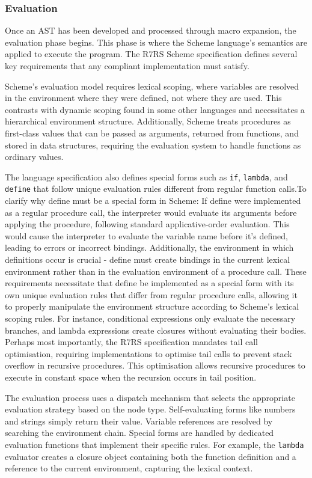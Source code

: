 \documentclass[final]{cmpreport_02}
\begin{document}
\subsubsection{Evaluation}
Once an AST has been developed and processed through macro expansion, the evaluation phase begins. This phase is where the Scheme language's semantics are applied to execute the program. The R7RS Scheme specification defines several key requirements that any compliant implementation must satisfy.

Scheme's evaluation model requires lexical scoping, where variables are resolved in the environment where they were defined, not where they are used. This contrasts with dynamic scoping found in some other languages and necessitates a hierarchical environment structure. Additionally, Scheme treats procedures as first-class values that can be passed as arguments, returned from functions, and stored in data structures, requiring the evaluation system to handle functions as ordinary values.

The language specification also defines special forms such as \texttt{if}, \texttt{lambda}, and \texttt{define} that follow unique evaluation rules different from regular function calls.To clarify why define must be a special form in Scheme: If define were implemented as a regular procedure call, the interpreter would evaluate its arguments before applying the procedure, following standard applicative-order evaluation. This would cause the interpreter to evaluate the variable name before it's defined, leading to errors or incorrect bindings. Additionally, the environment in which definitions occur is crucial - define must create bindings in the current lexical environment rather than in the evaluation environment of a procedure call. These requirements necessitate that define be implemented as a special form with its own unique evaluation rules that differ from regular procedure calls, allowing it to properly manipulate the environment structure according to Scheme's lexical scoping rules. For instance, conditional expressions only evaluate the necessary branches, and lambda expressions create closures without evaluating their bodies. Perhaps most importantly, the R7RS specification mandates tail call optimisation, requiring implementations to optimise tail calls to prevent stack overflow in recursive procedures. This optimisation allows recursive procedures to execute in constant space when the recursion occurs in tail position.

The evaluation process uses a dispatch mechanism that selects the appropriate evaluation strategy based on the node type. Self-evaluating forms like numbers and strings simply return their value. Variable references are resolved by searching the environment chain. Special forms are handled by dedicated evaluation functions that implement their specific rules. For example, the \texttt{lambda} evaluator creates a closure object containing both the function definition and a reference to the current environment, capturing the lexical context.
\end{document}
